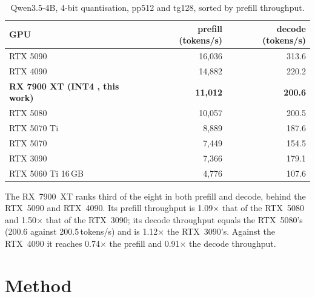 \documentclass[10.5pt,a4paper]{article}
\newcommand{\tx}[1]{\texttt{\detokenize{#1}}}
\begin{document}
\begin{table}[H]
\centering\small
\begin{tabular}{@{}lrr@{}}
\toprule
GPU & prefill (tokens/s) & decode (tokens/s)\\
\midrule
RTX 5090 & 16{,}036 & 313.6\\
RTX 4090 & 14{,}882 & 220.2\\
\textbf{RX 7900 XT (INT4 \tx{fast}, this work)} & \textbf{11{,}012} & \textbf{200.6}\\
RTX 5080 & 10{,}057 & 200.5\\
RTX 5070 Ti & 8{,}889 & 187.6\\
RTX 5070 & 7{,}449 & 154.5\\
RTX 3090 & 7{,}366 & 179.1\\
RTX 5060 Ti 16\,GB & 4{,}776 & 107.6\\
\bottomrule
\end{tabular}
\caption{Qwen3.5-4B, 4-bit quantisation, pp512 and tg128, sorted by prefill throughput.}
\end{table}

The RX~7900~XT ranks third of the eight in both prefill and decode, behind the RTX~5090 and RTX~4090. Its prefill throughput is 1.09$\times$ that of the RTX~5080 and 1.50$\times$ that of the RTX~3090;
its decode throughput equals the RTX~5080's (200.6 against 200.5\,tokens/s) and is 1.12$\times$ the RTX~3090's. Against the RTX~4090 it reaches 0.74$\times$ the prefill and 0.91$\times$ the decode throughput.

\section{Method}
\label{sec:method}
\end{document}
